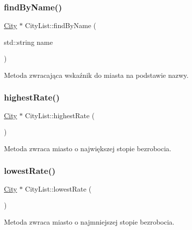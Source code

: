 \mbox{\label{struct_city_list_a9c1f021c9d6309a3151d35965019dbe3}} 
\subsubsection{\texorpdfstring{findByName()}{findByName()}}
{\footnotesize\ttfamily \mbox{\hyperlink{struct_city}{City}} $\ast$ City\+List\+::find\+By\+Name (\begin{DoxyParamCaption}\item[{std\+::string}]{name }\end{DoxyParamCaption})}



Metoda zwracająca wskaźnik do miasta na podstawie nazwy. 

\mbox{\label{struct_city_list_a2c9311fdf240fe5faab78d50633d75f1}} 
\subsubsection{\texorpdfstring{highestRate()}{highestRate()}}
{\footnotesize\ttfamily \mbox{\hyperlink{struct_city}{City}} $\ast$ City\+List\+::highest\+Rate (\begin{DoxyParamCaption}{ }\end{DoxyParamCaption})}



Metoda zwraca miasto o największej stopie bezrobocia. 

\mbox{\label{struct_city_list_ac33c6ce8afc982eb2c69d3a258a303a7}} 
\subsubsection{\texorpdfstring{lowestRate()}{lowestRate()}}
{\footnotesize\ttfamily \mbox{\hyperlink{struct_city}{City}} $\ast$ City\+List\+::lowest\+Rate (\begin{DoxyParamCaption}{ }\end{DoxyParamCaption})}



Metoda zwraca miasto o najmniejszej stopie bezrobocia. 

